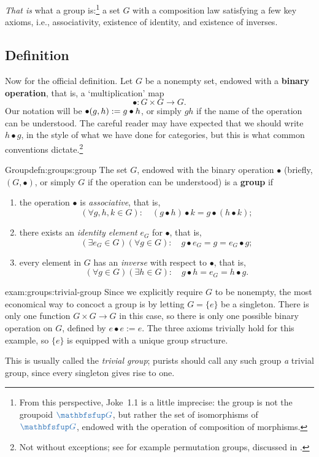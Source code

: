 \emph{That is} what a group is:\footnote{From this perspective,
  Joke~1.1 is a little imprecise: the group is not the groupoid
  $\categ{G}$, but rather the set of isomorphisms of $\categ{G}$,
  endowed with the operation of composition of morphisms.} a set $G$
with a composition law satisfying a few key axioms, i.e.,
associativity, existence of identity, and existence of inverses.

\subsection{Definition}
\label{subsec:groups:definition}
Now for the official definition. Let $G$ be a nonempty set, endowed
with a \textbf{binary operation}, that is, a `multiplication' map
\[
  \bullet \colon G \times G \to G.
\]
Our notation will be $\bullet(g, h) \mathrel{:=} g \bullet h$, or simply $gh$
if the name of the operation can be understood. The careful reader may
have expected that we should write $h \bullet g$, in the style of what
we have done for categories, but this is what common conventions
dictate.\footnote{Not without exceptions; see for example permutation
  groups, discussed in .}

\begin{defn}{Group}{defn:groups:group}
  The set $G$, endowed with the binary operation $\bullet$ (briefly,
  $(G, \bullet)$, or simply $G$ if the operation can be understood) is
  a \textbf{group} if
  \begin{enumerate}[label=(\roman*)]
  \item the operation $\bullet$ is \emph{associative}, that is,
    \[ (\forall g, h, k \in G) \colon \quad (g \bullet h) \bullet k =
      g \bullet (h \bullet k); \]
  \item there exists an \emph{identity element} $e_G$ for $\bullet$,
    that is,
    \[ (\exists e_G \in G)(\forall g \in G) \colon \quad g \bullet e_G
      = g = e_G \bullet g; \]
  \item every element in $G$ has an \emph{inverse} with respect to
    $\bullet$, that is,
    \[ (\forall g \in G)(\exists h \in G) \colon \quad g \bullet h =
      e_G = h \bullet g. \]
  \end{enumerate}
\end{defn}
\begin{exam}{}{exam:groups:trivial-group}
  Since we explicitly require $G$ to be nonempty, the most economical
  way to concoct a group is by letting $G = \{e\}$ be a
  singleton. There is only one function $G \times G \to G$ in this
  case, so there is only one possible binary operation on $G$, defined
  by $e \bullet e := e$. The three axioms trivially hold for this
  example, so $\{e\}$ is equipped with a unique group structure.

  This is usually called the \emph{trivial group}; purists should call
  any such group \emph{a} trivial group, since every singleton gives
  rise to one.
\end{exam}

